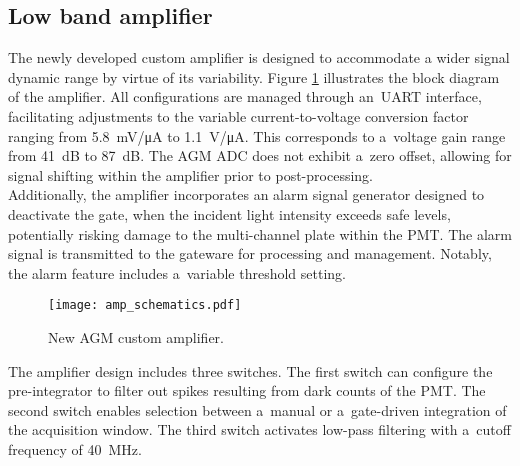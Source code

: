 \subsection{Low band amplifier}
The newly developed custom amplifier is designed to accommodate a wider signal
dynamic range by virtue of its variability.
Figure \ref{fig:amp_schematics} illustrates the block diagram of the amplifier.
All configurations are managed through an~UART interface, facilitating
adjustments to the variable current-to-voltage conversion factor ranging from
\SI{5.8}{mV/\micro A} to \SI{1.1}{V/\micro A}. This corresponds to a~voltage
gain range from \SI{41}{dB} to \SI{87}{dB}. The AGM ADC does not exhibit a~zero
offset, allowing for signal shifting within the amplifier prior to
post-processing.\\
Additionally, the amplifier incorporates an alarm signal generator designed to
deactivate the gate, when the incident light intensity exceeds safe levels,
potentially risking damage to the multi-channel plate within the PMT. The alarm
signal is transmitted to the gateware for processing and management. Notably,
the alarm feature includes a~variable threshold setting.
\begin{figure}[!tbh]
    \centering
    \texttt{[image: amp\_schematics.pdf]}
    \caption{New AGM custom amplifier.}
    \label{fig:amp_schematics}
\end{figure}
The amplifier design includes three switches. The first switch can configure
the pre-integrator to filter out spikes resulting from dark counts of the PMT.
The second switch enables selection between a~manual or a~gate-driven integration
of the acquisition window. The third switch activates low-pass filtering with a~cutoff frequency of \SI{40}{MHz}.

